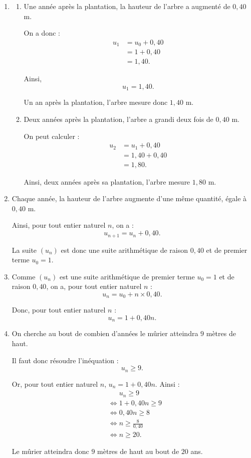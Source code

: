 \documentclass[10pt]{article}
\begin{document}
			\begin{enumerate}
				\item \begin{enumerate}
					\item Une année après la plantation, la hauteur de l'arbre a augmenté de $0{,}40$ m.
					
					On a donc :
					\begin{align*}
						u_1&=u_0+0{,}40\\
						&=1+0{,}40\\
						&=1{,}40.
					\end{align*}
					
					Ainsi,
					\[
					u_1=1{,}40.
					\]
					
					Un an après la plantation, l'arbre mesure donc $1{,}40$ m.
					
					\item Deux années après la plantation, l'arbre a grandi deux fois de $0{,}40$ m.
					
					On peut calculer :
					\begin{align*}
						u_2&=u_1+0{,}40\\
						&=1{,}40+0{,}40\\
						&=1{,}80.
					\end{align*}
					
					Ainsi, deux années après sa plantation, l'arbre mesure $1{,}80$ m.
				\end{enumerate}
				
				\item Chaque année, la hauteur de l'arbre augmente d'une même quantité, égale à $0{,}40$ m.
				
				Ainsi, pour tout entier naturel $n$, on a :
				\[
				u_{n+1}=u_n+0{,}40.
				\]
				
				La suite $(u_n)$ est donc une suite arithmétique de raison $0{,}40$ et de premier terme $u_0=1$.
				
				\item Comme $(u_n)$ est une suite arithmétique de premier terme $u_0=1$ et de raison $0{,}40$, on a, pour tout entier naturel $n$ :
				\[
				u_n=u_0+n\times 0{,}40.
				\]
				
				Donc, pour tout entier naturel $n$ :
				\[
				u_n=1+0{,}40n.
				\]
				
				\item On cherche au bout de combien d'années le mûrier atteindra $9$ mètres de haut.
				
				Il faut donc résoudre l'inéquation :
				\[
				u_n\geq 9.
				\]
				
				Or, pour tout entier naturel $n$, $u_n=1+0{,}40n$. Ainsi :
				\begin{align*}
					&\phantom{\iff}u_n\geq 9\\
					&\iff 1+0{,}40n\geq 9\\
					&\iff 0{,}40n\geq 8\\
					&\iff n\geq \frac{8}{0{,}40}\\
					&\iff n\geq 20.
				\end{align*}
				
				Le mûrier atteindra donc $9$ mètres de haut au bout de $20$ ans.
			\end{enumerate}
			
\end{document}
